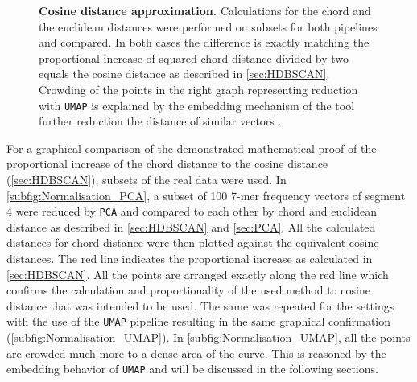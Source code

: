 \begin{figure}[!hbt]
\begin{subfigure}[b]{0.475\textwidth}
    \end{subfigure}
    \caption[Cosine distance approximation]{\textbf{Cosine distance approximation.} Calculations for the chord and the euclidean distances were performed on subsets for both pipelines and compared. In both cases the difference is exactly matching the proportional increase of squared chord distance divided by two equals the cosine distance as described in \autoref{sec:HDBSCAN}. Crowding of the points in the right graph representing reduction with \texttt{UMAP} is explained by the embedding mechanism of the tool further reduction the distance of similar vectors \autocite{mcinnes_umap_2020}.}
    \label{fig:Normalisation_Methods}
\end{figure}

For a graphical comparison of the demonstrated mathematical proof of the proportional increase of the chord distance to the cosine distance (\autoref{sec:HDBSCAN}), subsets of the real data were used. In \autoref{subfig:Normalisation_PCA}, a subset of 100 7-mer frequency vectors of segment 4 were reduced by \texttt{PCA} and compared to each other by chord and euclidean distance as described in \autoref{sec:HDBSCAN} and \autoref{sec:PCA}. All the calculated distances for chord distance were then plotted against the equivalent cosine distances. The red line indicates the proportional increase as calculated in \autoref{sec:HDBSCAN}. All the points are arranged exactly along the red line which confirms the calculation and proportionality of the used method to cosine distance that was intended to be used. The same was repeated for the settings with the use of the \texttt{UMAP} pipeline resulting in the same graphical confirmation (\autoref{subfig:Normalisation_UMAP}). In \autoref{subfig:Normalisation_UMAP}, all the points are crowded much more to a dense area of the curve. This is reasoned by the embedding behavior of \texttt{UMAP} and will be discussed in the following sections.











